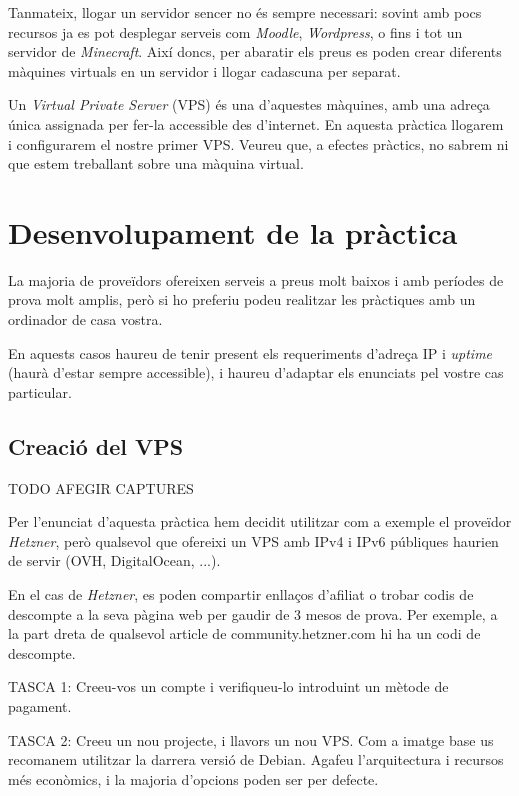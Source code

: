 \documentclass{practicaitic}
\begin{document}
Tanmateix, llogar un servidor sencer no és sempre necessari: sovint amb pocs
recursos ja es pot desplegar serveis com \textit{Moodle}, \textit{Wordpress},
o fins i tot un servidor de \textit{Minecraft}.
Així doncs, per abaratir els preus es poden crear diferents màquines virtuals
en un servidor i llogar cadascuna per separat.

Un \textit{Virtual Private Server} (VPS) és una d'aquestes màquines, amb una
adreça única assignada per fer-la accessible des d'internet. En aquesta
pràctica llogarem i configurarem el nostre primer VPS. Veureu que, a efectes pràctics,
no sabrem ni que estem treballant sobre una màquina virtual.

\section{Desenvolupament de la pràctica}

La majoria de proveïdors
ofereixen serveis a preus molt baixos i amb períodes de prova molt amplis, però
si ho preferiu podeu realitzar les pràctiques amb un ordinador de casa vostra.

En aquests casos haureu de tenir present els requeriments d'adreça IP i
\textit{uptime} (haurà d'estar sempre accessible), i haureu d'adaptar els
enunciats pel vostre cas particular.

\subsection{Creació del VPS}

TODO AFEGIR CAPTURES

Per l'enunciat d'aquesta pràctica hem decidit utilitzar com a exemple el
proveïdor \textit{Hetzner}, però qualsevol que ofereixi un VPS amb IPv4 i
IPv6 públiques haurien de servir (OVH, DigitalOcean, ...).

En el cas de \textit{Hetzner}, es poden compartir enllaços d'afiliat o trobar
codis de descompte a la seva pàgina web per gaudir de 3 mesos de prova. Per
exemple, a la part dreta de qualsevol article de community.hetzner.com hi ha un
codi de descompte.

TASCA 1: Creeu-vos un compte i verifiqueu-lo introduint un mètode de pagament.

TASCA 2: Creeu un nou projecte, i llavors un nou VPS. Com a imatge base us
recomanem utilitzar la darrera versió de Debian. Agafeu l'arquitectura i
recursos més econòmics, i la majoria d'opcions poden ser per defecte.
\end{document}
